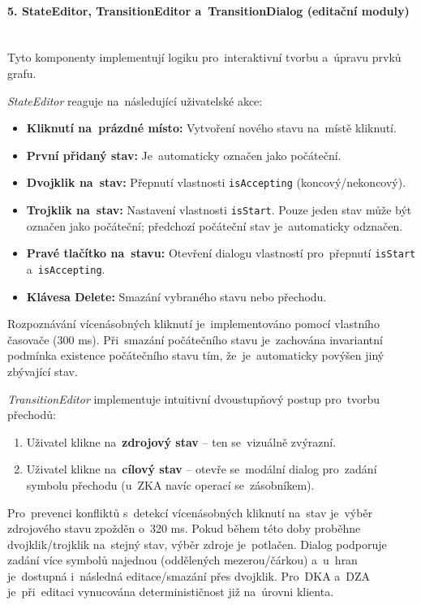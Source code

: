 \documentclass[
  master,
  program=ainfvs,
  printversion,
  figures=false,
  tables=false,
  glossaries,
  index
]{kidiplom}
\begin{document}
\paragraph{5. StateEditor, TransitionEditor a~TransitionDialog (editační moduly)} \mbox{} \\
Tyto komponenty implementují logiku pro~interaktivní tvorbu a~úpravu prvků grafu.

\textit{StateEditor} reaguje na~následující uživatelské akce:
\begin{itemize}
    \item \textbf{Kliknutí na~prázdné místo:} Vytvoření nového stavu na~místě kliknutí.
    \item \textbf{První přidaný stav:} Je~automaticky označen jako počáteční.
    \item \textbf{Dvojklik na~stav:} Přepnutí vlastnosti \texttt{isAccepting} (koncový/ne\-kon\-co\-vý).
    \item \textbf{Trojklik na~stav:} Nastavení vlastnosti \texttt{isStart}. Pouze jeden stav může být označen jako počáteční; předchozí počáteční stav je~automaticky odznačen.
    \item \textbf{Pravé tlačítko na~stavu:} Otevření dialogu vlastností pro~přepnutí \texttt{is\-Sta\-rt} a~\texttt{isAccepting}.
    \item \textbf{Klávesa Delete:} Smazání vybraného stavu nebo přechodu.
\end{itemize}

Rozpoznávání vícenásobných kliknutí je~implementováno pomocí vlastního časovače (300 ms). Při~smazání počátečního stavu je~zachována invariantní podmínka existence počátečního stavu tím, že~je~automaticky povýšen jiný zbývající stav.

\textit{TransitionEditor} implementuje intuitivní dvoustupňový postup pro~tvorbu přechodů:
\begin{enumerate}
    \item Uživatel klikne na~\textbf{zdrojový stav} -- ten se~vizuálně zvýrazní.
    \item Uživatel klikne na~\textbf{cílový stav} -- otevře se~modální dialog pro~zadání symbolu přechodu (u~\gls{ZKA} navíc operací se~zásobníkem).
\end{enumerate}

Pro~prevenci konfliktů s~detekcí vícenásobných kliknutí na~stav je~výběr zdrojového stavu zpožděn o~320 ms. Pokud během této doby proběhne dvojklik/trojklik na~stejný stav, výběr zdroje je~potlačen. Dialog podporuje zadání více symbolů najednou (oddělených mezerou/čárkou) a~u~hran je~dostupná i~následná editace/smazání přes dvojklik. Pro~\gls{DKA} a~\gls{DZA} je~při~editaci vynucována determinističnost již na~úrovni klienta.
\end{document}
